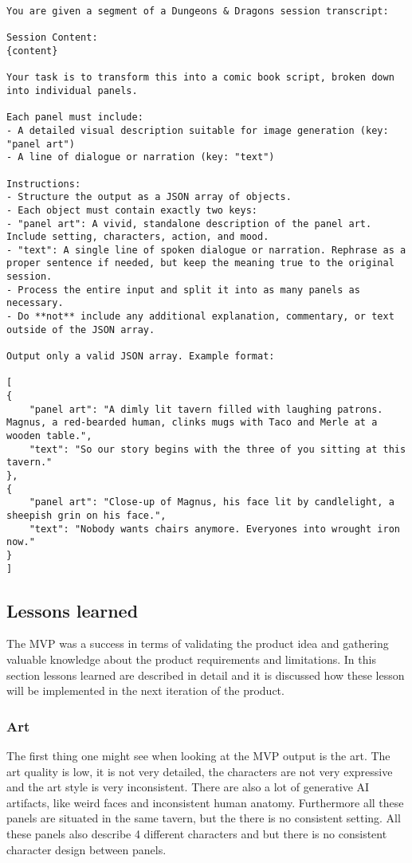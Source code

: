 \begin{lstlisting}[style=jsonstyle, caption={Prompt for Comic Book Script Generation}, label={lst:MPVLlamaprompt}]
You are given a segment of a Dungeons & Dragons session transcript:

Session Content:
{content}

Your task is to transform this into a comic book script, broken down into individual panels.

Each panel must include:
- A detailed visual description suitable for image generation (key: "panel art")
- A line of dialogue or narration (key: "text")

Instructions:
- Structure the output as a JSON array of objects.
- Each object must contain exactly two keys:
- "panel art": A vivid, standalone description of the panel art. Include setting, characters, action, and mood.
- "text": A single line of spoken dialogue or narration. Rephrase as a proper sentence if needed, but keep the meaning true to the original session.
- Process the entire input and split it into as many panels as necessary.
- Do **not** include any additional explanation, commentary, or text outside of the JSON array.

Output only a valid JSON array. Example format:

[
{
    "panel art": "A dimly lit tavern filled with laughing patrons. Magnus, a red-bearded human, clinks mugs with Taco and Merle at a wooden table.",
    "text": "So our story begins with the three of you sitting at this tavern."
},
{
    "panel art": "Close-up of Magnus, his face lit by candlelight, a sheepish grin on his face.",
    "text": "Nobody wants chairs anymore. Everyones into wrought iron now."
}
]
\end{lstlisting}

\subsection{Lessons learned}
The MVP was a success in terms of validating the product idea and gathering valuable knowledge about the product requirements and limitations. In this section lessons learned are described in detail and it is discussed how these lesson will be implemented in the next iteration of the product.

\subsubsection{Art}
The first thing one might see when looking at the MVP output is the art. The art quality is low, it is not very detailed, the characters are not very expressive and the art style is very inconsistent. There are also a lot of generative AI artifacts, like weird faces and inconsistent human anatomy. Furthermore all these panels are situated in the same tavern, but the there is no consistent setting. All these panels also describe 4 different characters and but there is no consistent character design between panels.

